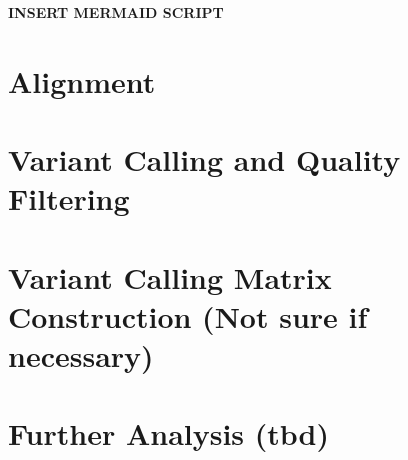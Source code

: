 
\textbf{INSERT MERMAID SCRIPT}

\section{Alignment}


\section{Variant Calling and Quality Filtering}






\section{Variant Calling Matrix Construction (Not sure if necessary)}


\section{Further Analysis (tbd)}

